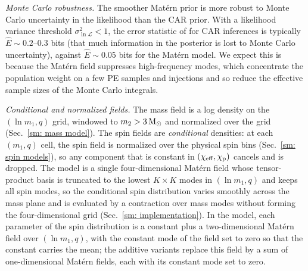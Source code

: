 \textit{Monte Carlo robustness.} The smoother Mat\'ern prior is more robust to Monte Carlo uncertainty in the likelihood than the \ac{CAR} prior. With a likelihood variance threshold $\sigma^2_{\ln \mathcal{L}} < 1$, the error statistic of \citet{Heinzel:2025ogf} for \ac{CAR} \PixelPop inferences is typically $\hat{E}\sim 0.2$--$0.3$ bits (that much information in the posterior is lost to Monte Carlo uncertainty), against $\hat{E}\sim 0.05$ bits for the Mat\'ern model. We expect this is because the Mat\'ern field suppresses high-frequency modes, which concentrate the population weight on a few \ac{PE} samples and injections and so reduce the effective sample sizes of the Monte Carlo integrals.

\textit{Conditional and normalized fields.} The mass field is a log density on the $(\ln m_1, q)$ grid, windowed to $m_2 > 3\,\mathrm{M}_{\odot}$ and normalized over the grid (Sec.~\ref{sm: mass model}). The spin fields are \textit{conditional} densities: at each $(m_1, q)$ cell, the spin field is normalized over the physical spin bins (Sec.~\ref{sm: spin models}), so any component that is constant in $(\chi_{\mathrm{eff}}, \chi_{\mathrm{p}})$ cancels and is dropped. The \flexiblespins model is a single four-dimensional Mat\'ern field whose tensor-product basis is truncated to the lowest $K \times K$ modes in $(\ln m_1, q)$ and keeps all spin modes, so the conditional spin distribution varies smoothly across the mass plane and is evaluated by a contraction over mass modes without forming the four-dimensional grid (Sec.~\ref{sm: implementation}). In the \gaussianspins model, each parameter of the spin distribution is a constant plus a two-dimensional Mat\'ern field over $(\ln m_1, q)$, with the constant mode of the field set to zero so that the constant carries the mean; the additive variants replace this field by a sum of one-dimensional Mat\'ern fields, each with its constant mode set to zero.
